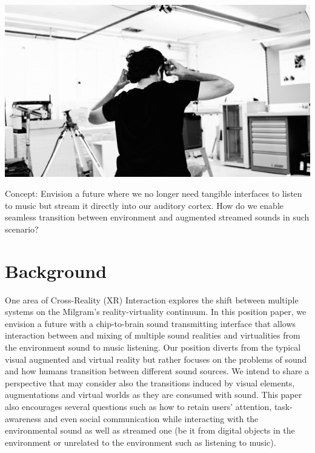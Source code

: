 \documentclass[sigchi]{acmart}
\begin{document}
\begin{teaserfigure}
  \includegraphics[trim={0 5.5cm 0 3.5cm}, clip, width=\textwidth]{acmart-master-2/samples/test2bw.png}
  \caption{Concept: Envision a future where we no longer need tangible interfaces to listen to music but stream it directly into our auditory cortex. How do we enable seamless transition between environment and augmented streamed sounds in such scenario?}
  \label{fig:teaser}
\end{teaserfigure}
\maketitle

\section{Background}
One area of Cross-Reality (XR) Interaction %
explores the shift between multiple systems on the Milgram's reality-virtuality continuum. %
In this position paper, we envision a future with a chip-to-brain sound transmitting interface that allows interaction between and mixing of multiple sound realities and virtualities from the environment sound to music listening. Our position diverts from the typical visual augmented and virtual reality but rather focuses on the problems of sound and how humans transition between different sound sources. We intend to share a perspective that may consider also the transitions induced by visual elements, augmentations and virtual worlds as they are consumed with sound. This paper also encourages several questions such as how to retain users' attention, task-awareness and even social communication while interacting with the environmental sound as well as streamed one (be it from digital objects in the environment or unrelated to the environment such as listening to music). 
\end{document}
